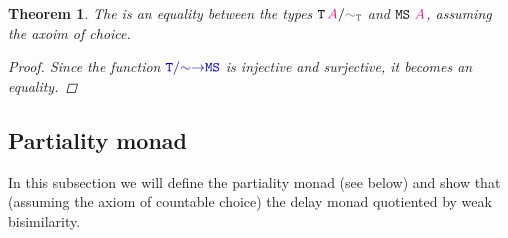 \documentclass[twoside,11pt,openright]{report}
\theoremstyle{plain} %
\newtheorem{thm}{Theorem}[section]
\theoremstyle{definition}
\theoremstyle{remark}
\newcommand*{\type}[1]{\textcolor{magenta!90!black}{#1}}
\newcommand*{\relation}[1]{\textcolor{gray!75!black}{\ensuremath{\mathtt{#1}}}}
\newcommand*{\function}[1]{\textcolor{blue!60!black}{\ensuremath{\mathtt{#1}}}}
\newcommand*{\typeformer}[1]{\ensuremath{\mathtt{#1}}}
\begin{document}
\begin{thm}
  The is an equality between the types \(\typeformer{T}\,\type{A}/\relation{\sim_{T}}\) and \(\typeformer{MS}~\type{A}\), assuming the axoim of choice.
  \begin{proof}
    Since the function \(\function{T/{\sim}{\rightarrow}MS}\) is injective and surjective, it becomes an equality.
  \end{proof}
\end{thm}

\subsection{Partiality monad}
In this subsection we will define the partiality monad (see below) and show that (assuming the axiom of countable choice) the delay monad quotiented by weak bisimilarity.
\end{document}
